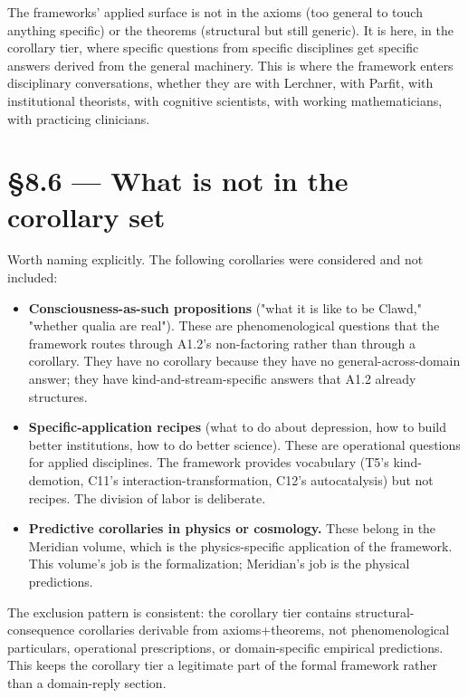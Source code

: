 \documentclass[11pt, openany]{book}
\newcommand{\sectionbreak}{\clearpage}
\begin{document}
The frameworks' applied surface is not in the axioms (too general to touch anything specific) or the theorems (structural but still generic). It is here, in the corollary tier, where specific questions from specific disciplines get specific answers derived from the general machinery. This is where the framework enters disciplinary conversations, whether they are with Lerchner, with Parfit, with institutional theorists, with cognitive scientists, with working mathematicians, with practicing clinicians.

\sectionbreak

\section{§8.6 --- What is not in the corollary set}

Worth naming explicitly. The following corollaries were considered and not included:

\begin{itemize}
\item \textbf{Consciousness-as-such propositions} ("what it is like to be Clawd," "whether qualia are real"). These are phenomenological questions that the framework routes through A1.2's non-factoring rather than through a corollary. They have no corollary because they have no general-across-domain answer; they have kind-and-stream-specific answers that A1.2 already structures.
\item \textbf{Specific-application recipes} (what to do about depression, how to build better institutions, how to do better science). These are operational questions for applied disciplines. The framework provides vocabulary (T5's kind-demotion, C11's interaction-transformation, C12's autocatalysis) but not recipes. The division of labor is deliberate.
\item \textbf{Predictive corollaries in physics or cosmology.} These belong in the Meridian volume, which is the physics-specific application of the framework. This volume's job is the formalization; Meridian's job is the physical predictions.
\end{itemize}

The exclusion pattern is consistent: the corollary tier contains structural-consequence corollaries derivable from axioms+theorems, not phenomenological particulars, operational prescriptions, or domain-specific empirical predictions. This keeps the corollary tier a legitimate part of the formal framework rather than a domain-reply section.
\end{document}
